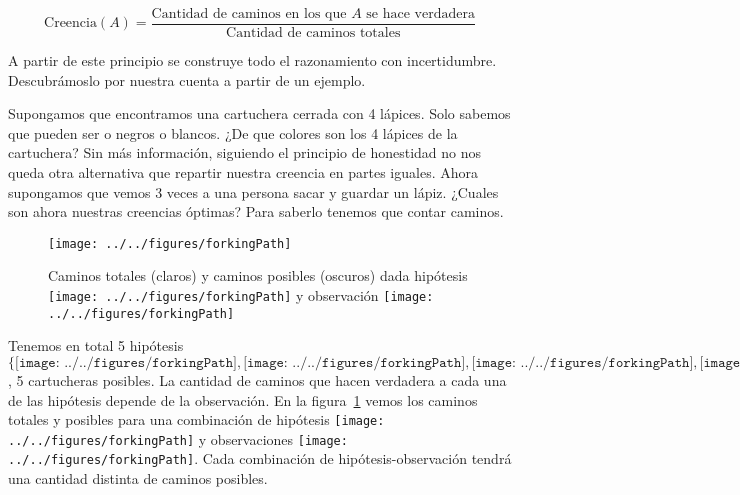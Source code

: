 \documentclass[a4paper,10pt]{article}
\begin{document}
 \begin{equation*}
  \text{Creencia}(A) = \frac{\text{Cantidad de caminos en los que $A$ se hace verdadera}}{\text{Cantidad de caminos totales}}
 \end{equation*}
 
 \vspace{0.2cm}
 A partir de este principio se construye todo el razonamiento con incertidumbre.
 Descubr\'amoslo por nuestra cuenta a partir de un ejemplo.
 
 Supongamos que encontramos una cartuchera cerrada con 4 l\'apices.
 Solo sabemos que pueden ser o negros o blancos.
 ¿De que colores son los 4 l\'apices de la cartuchera?
 Sin m\'as informaci\'on, siguiendo el principio de honestidad no nos queda otra alternativa que repartir nuestra creencia en partes iguales.
 Ahora supongamos que vemos 3 veces a una persona sacar y guardar un l\'apiz.
 ¿Cuales son ahora nuestras creencias \'optimas?
 Para saberlo tenemos que contar caminos.

 \begin{figure}[H]     
    \centering \small
     \texttt{[image: ../../figures/forkingPath]}
    
    \scriptsize Caminos totales (claros) y caminos posibles (oscuros) dada hip\'otesis \texttt{[image: ../../figures/forkingPath]} y observaci\'on \texttt{[image: ../../figures/forkingPath]}
    \caption{}
    \label{caminos}
\end{figure}

Tenemos en total 5 hip\'otesis $\{ \texttt{[image: ../../figures/forkingPath]},\texttt{[image: ../../figures/forkingPath]},\texttt{[image: ../../figures/forkingPath]},\texttt{[image: ../../figures/forkingPath]},\texttt{[image: ../../figures/forkingPath]} \}$, 5 cartucheras posibles.
La cantidad de caminos que hacen verdadera a cada una de las hip\'otesis depende de la observaci\'on.
En la figura~\ref{caminos} vemos los caminos totales y posibles para una combinaci\'on de hip\'otesis \texttt{[image: ../../figures/forkingPath]} y observaciones \texttt{[image: ../../figures/forkingPath]}.
Cada combinaci\'on de hip\'otesis-observaci\'on tendr\'a una cantidad distinta de caminos posibles.
 
\end{document}
